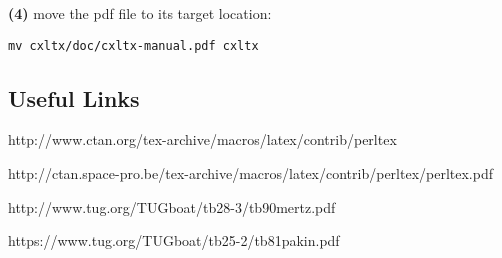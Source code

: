 \textbf{(4)} move the pdf file to its target location:

\begin{verbatim}
mv cxltx/doc/cxltx-manual.pdf cxltx
\end{verbatim}

\subsection{Useful Links}\label{useful-links}

http://www.ctan.org/tex-archive/macros/latex/contrib/perltex

http://ctan.space-pro.be/tex-archive/macros/latex/contrib/perltex/perltex.pdf

http://www.tug.org/TUGboat/tb28-3/tb90mertz.pdf

https://www.tug.org/TUGboat/tb25-2/tb81pakin.pdf
